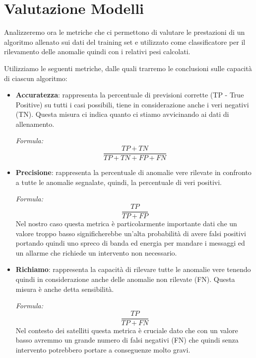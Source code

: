 \chapter{Valutazione Modelli}
Analizzeremo ora le metriche che ci permettono di valutare le prestazioni di un algoritmo allenato sui dati del training set e utilizzato come classificatore per il rilevamento delle anomalie quindi con i relativi pesi calcolati.

Utilizziamo le seguenti metriche, dalle quali trarremo le conclusioni sulle capacità di ciascun algoritmo: 
\begin{itemize}
    \item \textbf{Accuratezza}: rappresenta la percentuale di previsioni corrette (TP - True Positive) su tutti i casi possibili, tiene in considerazione anche i veri negativi (TN).
    Questa misura ci indica quanto ci stiamo avvicinando ai dati di allenamento.
    
    \textit{Formula:}
        \begin{equation}
            \frac{TP+TN}{TP+TN+FP+FN}
        \end{equation}
    
    \item \textbf{Precisione}: rappresenta la percentuale di anomalie vere rilevate in confronto a tutte le anomalie segnalate, quindi, la percentuale di veri positivi.

    \textit{Formula:}
        \begin{equation}
            \frac{TP}{TP+FP}
        \end{equation}
    Nel nostro caso questa metrica è particolarmente importante dati che un valore troppo basso significherebbe un'alta probabilità di avere falsi positivi portando quindi uno spreco di banda ed energia per mandare i messaggi ed un allarme che richiede un intervento non necessario.

    \item \textbf{Richiamo}: rappresenta la capacità di rilevare tutte le anomalie vere tenendo quindi in considerazione anche delle anomalie non rilevate (FN). Questa misura è anche detta sensibilità.

    \textit{Formula:} 
    \begin{equation}
        \frac{TP}{TP+FN}
    \end{equation}
    Nel contesto dei satelliti questa metrica è cruciale dato che con un valore basso avremmo un grande numero di falsi negativi (FN) che quindi senza intervento potrebbero portare a conseguenze molto gravi.
    

\end{itemize}
